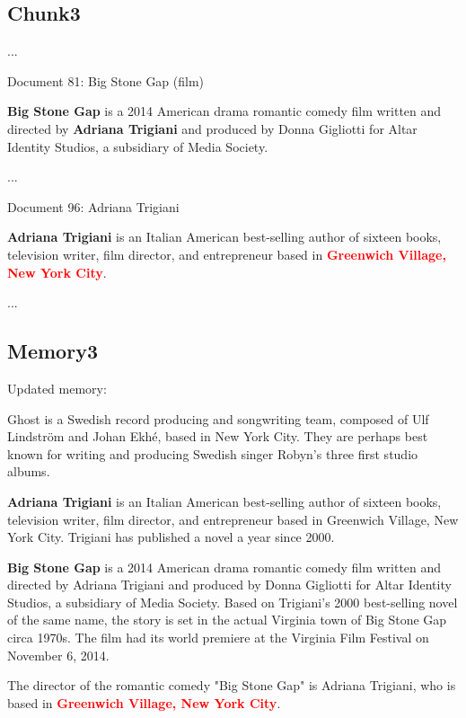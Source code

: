 \begin{tcolorbox}
\subsection*{Chunk3}
\vspace{-5pt}

...

Document 81:
Big Stone Gap (film)

\textbf{Big Stone Gap} is a 2014 American drama romantic comedy film written and directed by \textbf{Adriana Trigiani} and produced by Donna Gigliotti for Altar Identity Studios, a subsidiary of Media Society.

...

Document 96:
Adriana Trigiani

\textbf{Adriana Trigiani} is an Italian American best-selling author of sixteen books, television writer, film director, and entrepreneur based in \textcolor{red}{\textbf{Greenwich Village, New York City}}. 

...
\vspace{5pt}
\subsection*{Memory3}
\vspace{-5pt}
Updated memory:

\itemize
\item Ghost is a Swedish record producing and songwriting team, composed of Ulf Lindström and Johan Ekhé, based in New York City. They are perhaps best known for writing and producing Swedish singer Robyn's three first studio albums.
\item \textbf{Adriana Trigiani} is an Italian American best-selling author of sixteen books, television writer, film director, and entrepreneur based in Greenwich Village, New York City. Trigiani has published a novel a year since 2000.
\item \textbf{Big Stone Gap} is a 2014 American drama romantic comedy film written and directed by Adriana Trigiani and produced by Donna Gigliotti for Altar Identity Studios, a subsidiary of Media Society. Based on Trigiani's 2000 best-selling novel of the same name, the story is set in the actual Virginia town of Big Stone Gap circa 1970s. The film had its world premiere at the Virginia Film Festival on November 6, 2014.

The director of the romantic comedy "Big Stone Gap" is Adriana Trigiani, who is based in \textbf{\textcolor{red}{Greenwich Village, New York City}}.

\end{tcolorbox}